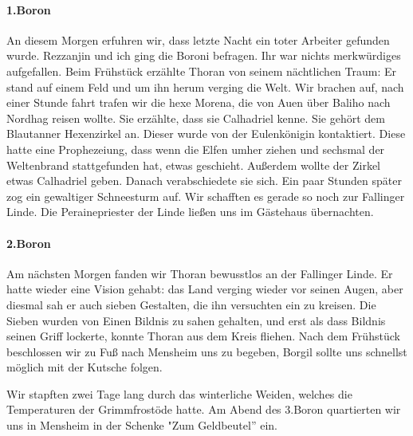 \paragraph{1.Boron}
An diesem Morgen erfuhren wir, dass letzte Nacht ein toter Arbeiter gefunden wurde. Rezzanjin und ich ging die Boroni befragen. Ihr war nichts merkwürdiges aufgefallen. Beim Frühstück erzählte Thoran von seinem nächtlichen Traum: Er stand auf einem Feld und um ihn herum verging die Welt. Wir brachen auf, nach einer Stunde fahrt trafen wir die hexe Morena, die von Auen über Baliho nach Nordhag reisen wollte. Sie erzählte, dass sie Calhadriel kenne. Sie gehört dem Blautanner Hexenzirkel an. Dieser wurde von der Eulenkönigin kontaktiert. Diese hatte eine Prophezeiung, dass wenn die Elfen umher ziehen und sechsmal der Weltenbrand stattgefunden hat, etwas geschieht. Außerdem wollte der Zirkel etwas Calhadriel geben. Danach verabschiedete sie sich. Ein paar Stunden später zog ein gewaltiger Schneesturm auf. Wir schafften es gerade so noch zur Fallinger Linde. Die Perainepriester der Linde ließen uns im Gästehaus übernachten.

\paragraph{2.Boron}
Am nächsten Morgen fanden wir Thoran bewusstlos an der Fallinger Linde. Er hatte wieder eine Vision gehabt: das Land verging wieder vor seinen Augen, aber diesmal sah er auch sieben Gestalten, die ihn versuchten ein zu kreisen. Die Sieben wurden von Einen Bildnis zu sahen gehalten, und erst als dass Bildnis seinen Griff lockerte, konnte Thoran aus dem Kreis fliehen. Nach dem Frühstück beschlossen wir zu Fuß nach Mensheim uns zu begeben, Borgil sollte uns schnellst möglich mit der Kutsche folgen.\par
Wir stapften zwei Tage lang durch das winterliche Weiden, welches die Temperaturen der Grimmfrostöde hatte. Am Abend des 3.Boron quartierten wir uns in Mensheim in der Schenke "Zum Geldbeutel'' ein.

